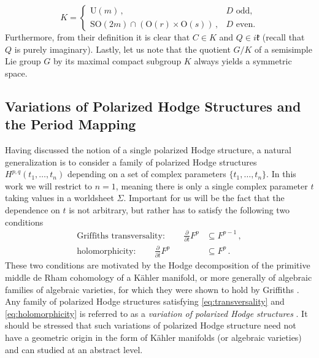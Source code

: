 \documentclass[11pt,a4paper]{article}
\numberwithin{equation}{section}
\numberwithin{table}{section}\setlength{\multlinegap}{25pt}
\begin{document}
\begin{equation}
	K = \begin{cases}
		\mathrm{U}(m)\,, & \text{$D$ odd,}\\
		\mathrm{SO}(2m)\cap\left(\mathrm{O}(r)\times \mathrm{O}(s)\right)\,, & \text{$D$ even.}
	\end{cases}
\end{equation}
Furthermore, from their definition it is clear that $C\in K$ and $Q\in i \mathfrak{k}$ (recall that $Q$ is purely imaginary). Lastly, let us note that the quotient $G/K$ of a semisimple Lie group $G$ by its maximal compact subgroup $K$ always yields a symmetric space. 

\subsection{Variations of Polarized Hodge Structures and the Period Mapping}\label{subsec:VHS}

Having discussed the notion of a single polarized Hodge structure, a natural generalization is to consider a family of polarized Hodge structures $H^{p,q}(t_1,\ldots, t_n)$ depending on a set of complex parameters $\{t_1,\ldots, t_n\}$. In this work we will restrict to $n=1$, meaning there is only a single complex parameter $t$ taking values in a worldsheet $\Sigma$. Important for us will be the fact that the dependence on $t$ is not arbitrary, but rather has to satisfy the following two conditions
\begin{align}
\label{eq:transversality}	\text{Griffiths transversality}:\qquad \frac{\partial}{\partial t} F^{p}&\subseteq F^{p-1}\,,\\
\label{eq:holomorphicity}	\text{holomorphicity}:\qquad \frac{\partial}{\partial \bar{t}} F^{p}&\subseteq F^{p}\,.
\end{align}
These two conditions are motivated by the Hodge decomposition of the primitive middle de Rham cohomology of a K\"ahler manifold, or more generally of algebraic families of algebraic varieties, for which they were shown to hold by Griffiths \cite{Griffiths:1968_I,Griffiths:1968_II}. Any family of polarized Hodge structures satisfying \eqref{eq:transversality} and \eqref{eq:holomorphicity} is referred to as a \textit{variation of polarized Hodge structures} \cite{Griffiths:1970}. It should be stressed that such variations of polarized Hodge structure need not have a geometric origin in the form of K\"ahler manifolds (or algebraic varieties) and can studied at an abstract level. 
\end{document}
